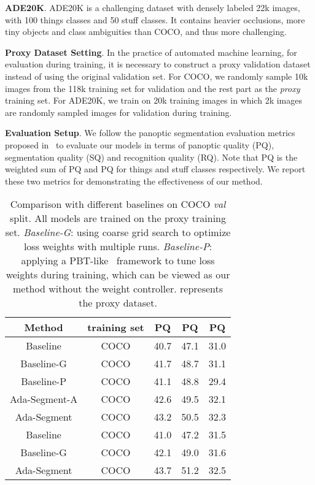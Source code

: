 \documentclass[letterpaper]{article} \usepackage{aaai21}  \usepackage{times}  \usepackage{helvet} \usepackage{courier}  \usepackage[hyphens]{url}  \usepackage{graphicx} \urlstyle{rm} \def\UrlFont{\rm}  \usepackage{natbib}  \usepackage{caption} \frenchspacing  \setlength{\pdfpagewidth}{8.5in}  \setlength{\pdfpageheight}{11in}
\begin{document}
 \noindent
 \textbf{ADE20K}. ADE20K is a challenging dataset with densely labeled 22k images, 
 with 100 things classes and 50 stuff classes. 
 It contains heavier occlusions, more tiny objects and class ambiguities than COCO,
  and thus more challenging.
 
 \noindent
 \textbf{Proxy Dataset Setting}. 
 In the practice of automated machine learning,
 for evaluation during training, it is necessary to construct a proxy validation
 dataset instead of using the original validation set. 
 For COCO, we randomly sample 10k images from the 118k training set 
 for validation and the rest part as the \textit{proxy} training set. 
 For ADE20K, we train on 20k training images in which 2k images are
  randomly sampled images for validation during training.


 \noindent
 \textbf{Evaluation Setup}.  We follow the panoptic segmentation evaluation
 metrics proposed in~\cite{panoptic_segmentation} to evaluate our
 models in terms of panoptic quality (PQ), segmentation quality (SQ)
 and recognition quality (RQ). Note that PQ is the weighted sum of PQ and PQ
 for things and stuff classes respectively. We report these two metrics for demonstrating 
 the effectiveness of our method.
 

 \begin{table}[t]
  \begin{centering}
  \tabcolsep 0.03in\renewcommand{\arraystretch}{1.2}{\footnotesize{}}\begin{tabular}{c|c|ccc}
  \hline 
  Method & training set & PQ & PQ & PQ \tabularnewline
  \hline 
  Baseline & COCO & 40.7 & 47.1 & 31.0 \tabularnewline
Baseline-G & COCO & 41.7 & 48.7 & 31.1 \tabularnewline
  Baseline-P & COCO & 41.1 & 48.8 & 29.4 \tabularnewline
  \hline 
  Ada-Segment-A & COCO & 42.6 & 49.5 & 32.1 \tabularnewline
  Ada-Segment & COCO & 43.2 & 50.5 & 32.3 \tabularnewline
  \hline 
  \hline 
  Baseline & COCO & 41.0 & 47.2 & 31.5 \tabularnewline
  Baseline-G & COCO & 42.1 & 49.0 & 31.6 \tabularnewline
\hline 
Ada-Segment & COCO & 43.7 & 51.2 & 32.5 \tabularnewline
\hline 
  \end{tabular}{\footnotesize\par}
  \par\end{centering}
\caption{\label{tab:Ablation-Studies-on-coco}Comparison with different baselines on COCO \textit{val} split.
  All models are trained on the proxy training set.   
  \textit{Baseline-G}: using coarse grid search to optimize loss weights with multiple runs.
  \textit{Baseline-P}: applying a PBT-like~\cite{jaderberg2017pbt} framework to tune 
  loss weights during training, which can be viewed as our method without the weight controller.  represents the proxy dataset.}
\end{table}  
\end{document}
